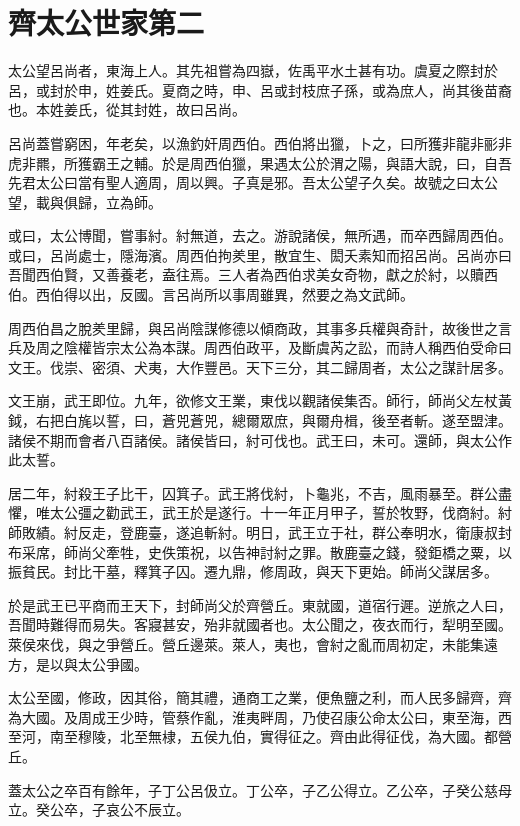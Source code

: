 \chapter{齊太公世家第二}

太公望呂尚者，東海上人。其先祖嘗為四嶽，佐禹平水土甚有功。虞夏之際封於呂，或封於申，姓姜氏。夏商之時，申、呂或封枝庶子孫，或為庶人，尚其後苗裔也。本姓姜氏，從其封姓，故曰呂尚。

呂尚蓋嘗窮困，年老矣，以漁釣奸周西伯。西伯將出獵，卜之，曰所獲非龍非彨非虎非羆，所獲霸王之輔。於是周西伯獵，果遇太公於渭之陽，與語大說，曰，自吾先君太公曰當有聖人適周，周以興。子真是邪。吾太公望子久矣。故號之曰太公望，載與俱歸，立為師。

或曰，太公博聞，嘗事紂。紂無道，去之。游說諸侯，無所遇，而卒西歸周西伯。或曰，呂尚處士，隱海濱。周西伯拘羑里，散宜生、閎夭素知而招呂尚。呂尚亦曰吾聞西伯賢，又善養老，盍往焉。三人者為西伯求美女奇物，獻之於紂，以贖西伯。西伯得以出，反國。言呂尚所以事周雖異，然要之為文武師。

周西伯昌之脫羑里歸，與呂尚陰謀修德以傾商政，其事多兵權與奇計，故後世之言兵及周之陰權皆宗太公為本謀。周西伯政平，及斷虞芮之訟，而詩人稱西伯受命曰文王。伐崇、密須、犬夷，大作豐邑。天下三分，其二歸周者，太公之謀計居多。

文王崩，武王即位。九年，欲修文王業，東伐以觀諸侯集否。師行，師尚父左杖黃鉞，右把白旄以誓，曰，蒼兕蒼兕，總爾眾庶，與爾舟楫，後至者斬。遂至盟津。諸侯不期而會者八百諸侯。諸侯皆曰，紂可伐也。武王曰，未可。還師，與太公作此太誓。

居二年，紂殺王子比干，囚箕子。武王將伐紂，卜龜兆，不吉，風雨暴至。群公盡懼，唯太公彊之勸武王，武王於是遂行。十一年正月甲子，誓於牧野，伐商紂。紂師敗績。紂反走，登鹿臺，遂追斬紂。明日，武王立于社，群公奉明水，衛康叔封布采席，師尚父牽牲，史佚策祝，以告神討紂之罪。散鹿臺之錢，發鉅橋之粟，以振貧民。封比干墓，釋箕子囚。遷九鼎，修周政，與天下更始。師尚父謀居多。

於是武王已平商而王天下，封師尚父於齊營丘。東就國，道宿行遲。逆旅之人曰，吾聞時難得而易失。客寢甚安，殆非就國者也。太公聞之，夜衣而行，犁明至國。萊侯來伐，與之爭營丘。營丘邊萊。萊人，夷也，會紂之亂而周初定，未能集遠方，是以與太公爭國。

太公至國，修政，因其俗，簡其禮，通商工之業，便魚鹽之利，而人民多歸齊，齊為大國。及周成王少時，管蔡作亂，淮夷畔周，乃使召康公命太公曰，東至海，西至河，南至穆陵，北至無棣，五侯九伯，實得征之。齊由此得征伐，為大國。都營丘。

蓋太公之卒百有餘年，子丁公呂伋立。丁公卒，子乙公得立。乙公卒，子癸公慈母立。癸公卒，子哀公不辰立。

